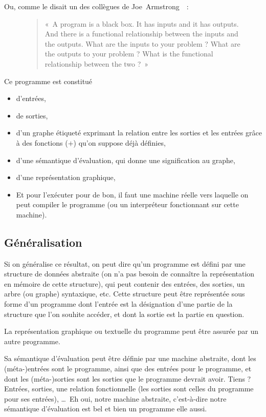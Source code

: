\documentclass{article}
\begin{document}
Ou, comme le disait un des collègues de Joe~Armstrong~\cite{what-are-the-inputs}\nocite{coders-at-work}~:

\begin{figure}[h!]
  \centering
  \begin{quotation}
    «~A program is a black box. It has inputs and it has outputs. And there is a functional relationship between the inputs and the outputs. What are the inputs to your problem ? What are the outputs to your problem ? What is the functional relationship between the two ?~»
  \end{quotation}
\end{figure}

Ce programme est constitué
\begin{itemize}
\item d'entrées,
\item de sorties,
\item d'un graphe étiqueté exprimant la relation entre les sorties et les entrées grâce à des fonctions ($+$) qu'on suppose déjà définies,
\item d'une sémantique d'évaluation, qui donne une signification au graphe,
\item d'une représentation graphique,
\item Et pour l'exécuter pour de bon, il faut une machine réelle vers laquelle on peut compiler le programme (ou un interpréteur fonctionnant sur cette machine).
\end{itemize}

\subsection{Généralisation}
Si on généralise ce résultat, on peut dire qu'un programme est défini par une structure de données abstraite (on n'a pas besoin de connaître la représentation en mémoire de cette structure), qui peut contenir des entrées, des sorties, un arbre (ou graphe) syntaxique, etc. Cette structure peut être représentée sous forme d'un programme dont l'entrée est la désignation d'une partie de la structure que l'on souhite accéder, et dont la sortie est la partie en question.

La représentation graphique ou textuelle du programme peut être assurée par un autre programme.

Sa sémantique d'évaluation peut être définie par une machine abstraite, dont les (méta-)entrées sont le programme, ainsi que des entrées pour le programme, et dont les (méta-)sorties sont les sorties que le programme devrait avoir. Tiens ? Entrées, sorties, une relation fonctionnelle (les sorties sont celles du programme pour ses entrées), \dots\ Eh oui, notre machine abstraite, c'est-à-dire notre sémantique d'évaluation est bel et bien un programme elle aussi.
\end{document}
